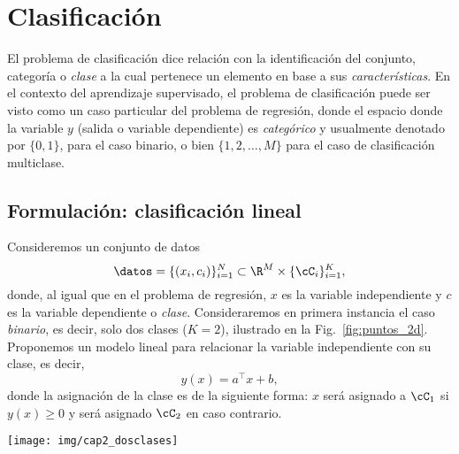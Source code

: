 
\section{Clasificación}
\label{cap:clasificacion}

El problema de clasificación dice relación con la identificación del conjunto, categoría o \emph{clase} a la cual pertenece un elemento en base a sus \emph{características}. En el contexto del aprendizaje supervisado, el problema de clasificación puede ser visto como un caso particular del problema de regresión, donde el espacio donde la variable  $y$ (salida o variable dependiente) es \emph{categórico} y usualmente denotado por $\{0,1\}$, para el caso binario, o bien $\{1,2,\ldots,M\}$ para el caso de clasificación multiclase. 
	

\subsection{Formulación: clasificación lineal}
\label{sec:clasif_lineal}

\noindent\begin{minipage}{0.52\textwidth}
	Consideremos un conjunto de datos
	\begin{equation}
	 	\datos = \{(x_i,c_i)\}_{i=1}^N\subset\R^M\times\{\cC_i\}_{i=1}^K,
	 \end{equation}
	 donde, al igual que en el problema de regresión, $x$ es la variable independiente y $c$ es la variable dependiente o \emph{clase}. Consideraremos en primera instancia el caso \emph{binario}, es decir, solo dos clases ($K=2$), ilustrado en la Fig.~\ref{fig:puntos_2d}. Proponemos un modelo lineal para relacionar la variable independiente con su clase, es decir, 
	\begin{equation}
		y(x) = a^\top  x + b,
		\label{eq:clasificacion_lineal}
	\end{equation}
	donde la  asignación de la clase es de la siguiente forma: $x$ será asignado a $\cC_1$ si $y(x) \geq 0$ y será asignado $\cC_2$ en caso contrario.
\end{minipage}\hfill
\begin{minipage}{0.46\textwidth}
	\centering
	\texttt{[image: img/cap2\_dosclases]}\\
	\label{fig:puntos_2d}
\end{minipage}

